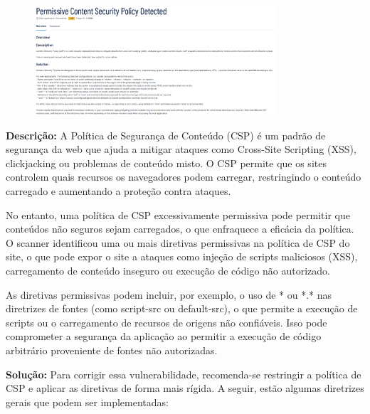 \documentclass[a4paper,12pt]{article}
\begin{document}
\begin{enumerate}
                        \begin{figure}[h!]
                        \centering
                        \includegraphics[width=0.8\textwidth]{assets/images-was/Outras Vulnerabilidades Críticas e Explorações/Desafios de Configuração de Segurança/Permissive Content Security Policy Detected.png}
                        \end{figure}
                        \FloatBarrier
                        \textbf{Descrição:} A Política de Segurança de Conteúdo (CSP) é um padrão de segurança da web que ajuda a mitigar ataques como Cross-Site Scripting (XSS), clickjacking ou problemas de conteúdo misto. O CSP permite que os sites controlem quais recursos os navegadores podem carregar, restringindo o conteúdo carregado e aumentando a proteção contra ataques.

No entanto, uma política de CSP excessivamente permissiva pode permitir que conteúdos não seguros sejam carregados, o que enfraquece a eficácia da política. O scanner identificou uma ou mais diretivas permissivas na política de CSP do site, o que pode expor o site a ataques como injeção de scripts maliciosos (XSS), carregamento de conteúdo inseguro ou execução de código não autorizado.

As diretivas permissivas podem incluir, por exemplo, o uso de * ou *.* nas diretrizes de fontes (como script-src ou default-src), o que permite a execução de scripts ou o carregamento de recursos de origens não confiáveis. Isso pode comprometer a segurança da aplicação ao permitir a execução de código arbitrário proveniente de fontes não autorizadas.

\textbf{Solução:} Para corrigir essa vulnerabilidade, recomenda-se restringir a política de CSP e aplicar as diretivas de forma mais rígida. A seguir, estão algumas diretrizes gerais que podem ser implementadas:


\end{enumerate}
\end{document}
